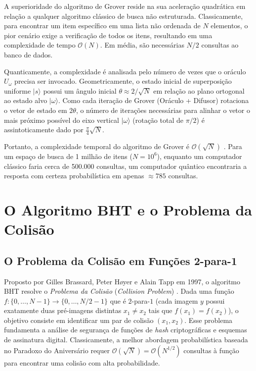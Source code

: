 \documentclass[12pt, a4paper]{article}
\newcommand{\ket}[1]{\lvert #1 \rangle}
\begin{document}
A superioridade do algoritmo de Grover reside na sua aceleração quadrática em relação a qualquer algoritmo clássico de busca não estruturada. Classicamente, para encontrar um item específico em uma lista não ordenada de $N$ elementos, o pior cenário exige a verificação de todos os itens, resultando em uma complexidade de tempo $\mathcal{O}(N)$. Em média, são necessárias $N/2$ consultas ao banco de dados.

Quanticamente, a complexidade é analisada pelo número de vezes que o oráculo $U_\omega$ precisa ser invocado. Geometricamente, o estado inicial de superposição uniforme $\ket{s}$ possui um ângulo inicial $\theta \approx 2/\sqrt{N}$ em relação ao plano ortogonal ao estado alvo $\ket{\omega}$. Como cada iteração de Grover (Oráculo + Difusor) rotaciona o vetor de estado em $2\theta$, o número de iterações necessárias para alinhar o vetor o mais próximo possível do eixo vertical $\ket{\omega}$ (rotação total de $\pi/2$) é assintoticamente dado por $\frac{\pi}{4}\sqrt{N}$.

Portanto, a complexidade temporal do algoritmo de Grover é $\mathcal{O}(\sqrt{N})$ \cite{nielsen2010}. Para um espaço de busca de 1 milhão de itens ($N = 10^6$), enquanto um computador clássico faria cerca de 500.000 consultas, um computador quântico encontraria a resposta com certeza probabilística em apenas $\approx 785$ consultas. 

\section{O Algoritmo BHT e o Problema da Colisão}

\subsection{O Problema da Colisão em Funções 2-para-1}

Proposto por Gilles Brassard, Peter Høyer e Alain Tapp em 1997, o algoritmo BHT resolve o \textit{Problema da Colisão} (\textit{Collision Problem}) \cite{nielsen2010}. Dada uma função $f: \{0, \dots, N-1\} \to \{0, \dots, N/2 - 1\}$ que é $2$-para-$1$ (cada imagem $y$ possui exatamente duas pré-imagens distintas $x_1 \neq x_2$ tais que $f(x_1) = f(x_2)$), o objetivo consiste em identificar um par de colisão $(x_1, x_2)$. Esse problema fundamenta a análise de segurança de funções de \textit{hash} criptográficas e esquemas de assinatura digital. Classicamente, a melhor abordagem probabilística baseada no Paradoxo do Aniversário requer $\mathcal{O}(\sqrt{N}) = \mathcal{O}(N^{1/2})$ consultas à função para encontrar uma colisão com alta probabilidade.
\end{document}
